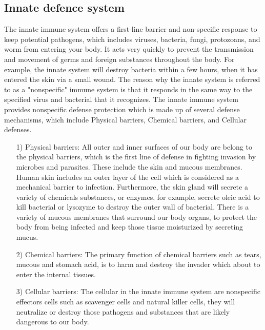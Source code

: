 \documentclass[12pt]{article}
\begin{document}
\subsection{Innate defence system}
The innate immune system offers a first-line barrier and non-specific response to keep potential pathogens, which includes viruses, bacteria, fungi, protozoans, and worm from entering your body. It acts very quickly to prevent the transmission and movement of germs and foreign substances throughout the body. For example, the innate system will destroy bacteria within a few hours, when it has entered the skin via a small wound. The reason why the innate system is referred to as a "nonspecific" immune system is that it responds in the same way to the specified virus and bacterial that it recognizes. The innate immune system provides nonspecific defense protection which is made up of several defense mechanisms, which include Physical barriers, Chemical barriers, and Cellular defenses.
\begin{itemize}
    \item [1)] 
    Physical barriers: All outer and inner surfaces of our body are belong to the physical
    barriers, which is the first line of defense in fighting invasion by microbes and parasites. These include the skin and mucous membranes. Human skin includes an outer layer of the cell which is considered as a mechanical barrier to infection. Furthermore, the skin gland will secrete a variety of chemicals substances, or enzymes, for example, secrete oleic acid to kill bacterial or lysozyme to destroy the outer wall of bacterial. There is a variety of mucous membranes that surround our body organs, to protect the body from being infected and keep those tissue moisturized by secreting mucus.
    \item [2)]
    Chemical barriers: The primary function of chemical barriers such as tears, mucous and stomach acid, is to harm and destroy the invader which about to enter the internal tissues.
    \item [3)]
    Cellular barriers: The cellular in the innate immune system are nonspecific effectors cells such as scavenger cells and natural killer cells, they will neutralize or destroy those pathogens and substances that are likely dangerous to our body. 
\end{itemize}
\end{document}
